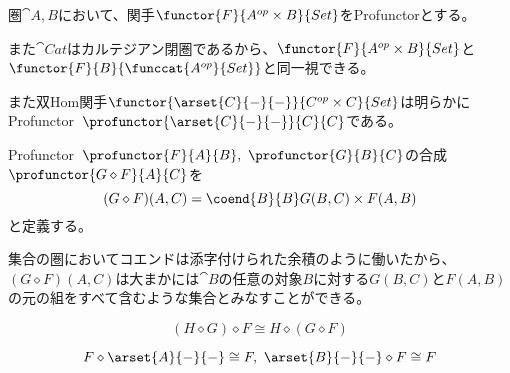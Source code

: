 \documentclass[uplatex,dvipdfmx]{jsarticle}
\begin{document}
  \begin{define}[Profunctor]
    圏$\cat{A,B}$において、関手$\functor{F}{A^{op}\times B}{Set}$をProfunctorとする。
    
    また$\cat{Cat}$はカルテジアン閉圏であるから、$\functor{F}{A^{op}\times B}{Set}$と$\functor{F}{B}{\funccat{A^{op}}{Set}}$と同一視できる。
  \end{define}
  また双Hom関手$\functor{\arset{C}{-}{-}}{C^{op}\times C}{Set}$は明らかにProfunctor\ $\profunctor{\arset{C}{-}{-}}{C}{C}$である。
  \begin{define}[Profunctorの合成]
    Profunctor\ $\profunctor{F}{A}{B},\ \profunctor{G}{B}{C}$の合成
    $\profunctor{G\diamond F}{A}{C}$を
    \[(G\diamond F)(A,C) = \coend{B}{B} G(B, C)\times F(A, B)\]と定義する。
  \end{define}
  集合の圏においてコエンドは添字付けられた余積のように働いたから、$(G\diamond F)(A,C)$は大まかには$\cat{B}$の任意の対象$B$に対する$G(B,C)$と$F(A,B)$の元の組をすべて含むような集合とみなすことができる。
  \begin{prop}[Profunctorの結合律]
    \[(H\diamond G)\diamond F \cong H\diamond(G\diamond F)\]
  \end{prop}
  \begin{prop}[Profunctorの単位元律]
    \[F\diamond \arset{A}{-}{-} \cong F,\ \arset{B}{-}{-}\diamond F\cong F\]
  \end{prop}
\end{document}
